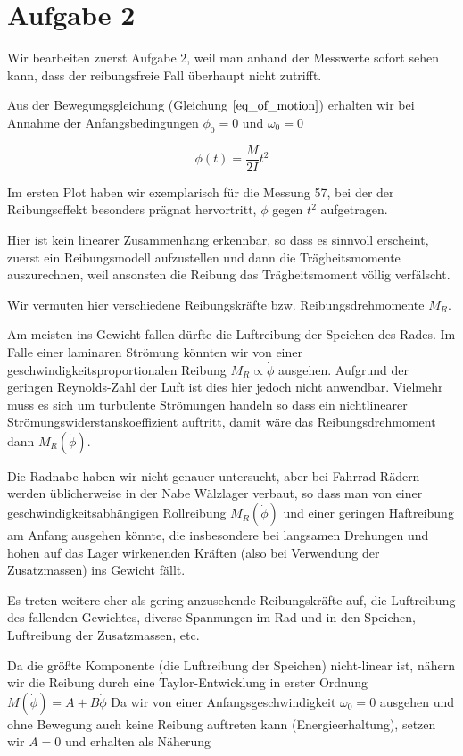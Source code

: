 \documentclass[a4paper,german,12pt,smallheadings]{scrartcl}
\begin{document}
\section*{Aufgabe 2}
Wir bearbeiten zuerst Aufgabe 2, weil man anhand der Messwerte sofort sehen
kann, dass der reibungsfreie Fall überhaupt nicht zutrifft.

Aus der Bewegungsgleichung (Gleichung $\ref{eq_of_motion}$) erhalten wir bei
Annahme der Anfangsbedingungen $\phi_0 = 0$ und $\omega_0 = 0$

\begin{equation}
  \phi(t) = \frac{M}{2I} t^2
\end{equation}

Im ersten Plot haben wir exemplarisch für die Messung 57, bei der der Reibungseffekt
besonders prägnat hervortritt, $\phi$ gegen $t^2$ aufgetragen.

Hier ist kein linearer Zusammenhang erkennbar, so dass es sinnvoll erscheint,
zuerst ein Reibungsmodell aufzustellen und dann die Trägheitsmomente
auszurechnen, weil ansonsten die Reibung das Trägheitsmoment völlig verfälscht.

Wir vermuten hier verschiedene Reibungskräfte bzw. Reibungsdrehmomente $M_R$.

Am meisten ins Gewicht fallen dürfte die Luftreibung der Speichen des Rades. Im
Falle einer laminaren Strömung könnten wir von einer
geschwindigkeitsproportionalen Reibung $M_R \propto \dot{\phi}$ ausgehen.
Aufgrund der geringen Reynolds-Zahl der Luft ist dies hier jedoch nicht
anwendbar. Vielmehr muss es sich um turbulente Strömungen handeln so dass ein
nichtlinearer Strömungswiderstanskoeffizient auftritt, damit wäre das
Reibungsdrehmoment dann $M_R(\dot{\phi})$.

Die Radnabe haben wir nicht genauer untersucht, aber bei Fahrrad-Rädern werden
üblicherweise in der Nabe Wälzlager verbaut, so dass man von einer
geschwindigkeitsabhängigen Rollreibung $M_R(\dot{\phi})$ und einer geringen
Haftreibung am Anfang ausgehen könnte, die insbesondere bei langsamen Drehungen
und hohen auf das Lager wirkenenden Kräften (also bei Verwendung der
Zusatzmassen) ins Gewicht fällt.

Es treten weitere eher als gering anzusehende Reibungskräfte auf, die
Luftreibung des fallenden Gewichtes, diverse Spannungen im Rad und in den
Speichen, Luftreibung der Zusatzmassen, etc.

Da die größte Komponente (die Luftreibung der Speichen) nicht-linear ist,
nähern wir die Reibung durch eine Taylor-Entwicklung in erster Ordnung $
M(\dot{\phi}) = A + B \dot{\phi}$
Da wir von einer Anfangsgeschwindigkeit $\omega_0=0$ ausgehen und ohne Bewegung
auch keine Reibung auftreten kann (Energieerhaltung), setzen wir $A=0$ und
erhalten als Näherung
\end{document}
